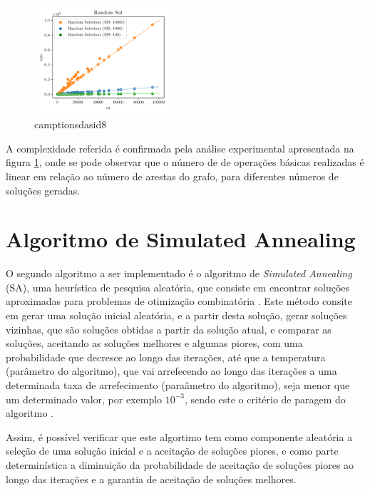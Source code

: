 \documentclass[mirror, portugues]{revdetua}
\begin{document}
\begin{figure}[H]
    \centering
    \includegraphics[width=0.45\textwidth]{../assets/ops_Random Sol.png}
    \caption{camptionsdasid8}
    \label{fig:random_ops}
\end{figure}

A complexidade referida é confirmada pela análise experimental apresentada na figura \ref{fig:random_ops}, onde se pode observar que o número de de operações básicas realizadas é linear em relação ao número de arestas do grafo, para diferentes números de soluções geradas.





\section{Algoritmo de Simulated Annealing}

O segundo algoritmo a ser implementado é o algoritmo de \textit{Simulated Annealing} (SA), uma heurística de pesquisa aleatória, que consiste em encontrar soluções aproximadas para problemas de otimização combinatória \cite{SAT15}. Este método consite em gerar uma solução inicial aleatória, e a partir desta solução, gerar soluções vizinhas, que são soluções obtidas a partir da solução atual, e comparar as soluções, aceitando as soluções melhores e algumas piores, com uma probabilidade que decresce ao longo das iterações, até que a temperatura (parâmetro do algoritmo), que vai arrefecendo ao longo das iterações a uma determinada taxa de arrefecimento (paraâmetro do algoritmo), seja menor que um determinado valor, por exemplo $10^{-3}$, sendo este o critério de paragem do algoritmo \cite{SA87}.

Assim, é possível verificar que este algortimo tem como componente aleatória a seleção de uma solução inicial e a aceitação de soluções piores, e como parte determinística a diminuição da probabilidade de aceitação de soluções piores ao longo das iterações e a garantia de aceitação de soluções melhores.
\end{document}
